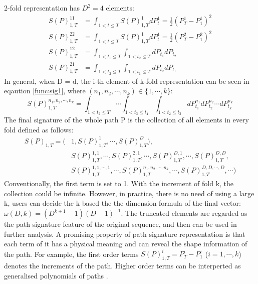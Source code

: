 2-fold representation has $D^2 = 4$ elements:
\begin{equation}
    \begin{aligned}
        S(P)_{1,T}^{11} & = \int_{1 < t \le T} S(P)_{1,T}^1dP_t^1 = \frac{1}{2} (P_T^1 - P_1^1)^2 \\
        S(P)_{1,T}^{22} & = \int_{1 < t \le T} S(P)_{1,T}^1dP_t^1 = \frac{1}{2} (P_T^2 - P_1^2)^2 \\
        S(P)_{1,T}^{12} & = \int_{1 < t_1 \le T}\int_{1 < t_2 \le T}dP_{t_1}dP_{t_2} \\
        S(P)_{1,T}^{21} & = \int_{1 < t_2 \le T}\int_{1 < t_1 \le T}dP_{t_2}dP_{t_1}
    \end{aligned}
\end{equation}
In general, when D = d, the i-th element of k-fold representation can be seen in eqaution \ref{func:sig1}, where $(n_1,n_2, \cdots, n_k) \in \{1, \cdots, k\}$:
\begin{equation}
    \label{func:sig1}
    S(P)_{1,T}^{n_1,n_2,\cdots, n_k} = \int_{1 < t_k \le T} \cdots \int_{1 < t_3 \le t_4} \int_{1 < t_2 \le t_3}dP_{t_1}^{n_1}dP_{t_2}^{n_2} \cdots dP_{t_k}^{n_k}
\end{equation}
The final signature of the whole path P is the collection of all elements in every fold defined as follows:
\begin{equation}
    \begin{aligned}
        S(P)_{1,T} = (& 1, S(P)_{1,T}^1, \cdots, S(P)_{1,T}^D), \\
        & S(P)_{1,T}^{1,1}, \cdots, S(P)_{1,T}^{2,1}, \cdots, S(P)_{1,T}^{D,1}, \cdots, S(P)_{1,T}^{D,D}, \\
        & S(P)_{1,T}^{1, 1,\cdots, 1}, \cdots, S(P)_{1,T}^{n_1, n_2,\cdots, n_k}, \cdots, S(P)_{1,T}^{D,D,\cdots,D}, \cdots)
    \end{aligned}
\end{equation}
Conventionally, the first term is set to 1. With the increment of fold k, the collection could be infinite. However, in practice, there is no need of using a large k, users can decide the k based the the dimension formula of the final vector: $\omega(D,k) = (D^{k+1} - 1) (D-1)^{-1} $. The truncated elements are regarded as the path signature feature of the original sequence, and then can be used in further analysis. A promising property of path signature representation is that each term of it has a physical meaning and can reveal the shape information of the path. For example, the first order terms $S(P)_{1,T}^i = P_T^i-P_1^i$ ($i=1,\cdots,k$) denotes the increments of the path. Higher order terms can be interperted as generalised polynomials of paths \cite{chevyrev2016primer}.\\
